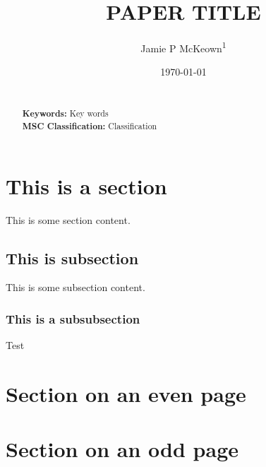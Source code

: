 \documentclass[9pt, reqno]{amsart}
\numberwithin{equation}{section}
\renewcommand{\(}{\left(}
\renewcommand{\)}{\right)}
\theoremstyle{definition}
\theoremstyle{definition}
\theoremstyle{definition}
\newcommand{\draft}[1]{\textcolor{draftcol}{#1}}
\begin{document}
\title{PAPER TITLE}

\author[JP McKeown]{Jamie P McKeown\textsuperscript{1}}




\address[A1]{School of Mathematics, Statistics, and Physics, Newcastle University, Newcastle upon Tyne, UK.}



\date{\today}
\maketitle 





\begin{abstract}
 \centering \bigskip
  \begin{minipage}{\dimexpr\paperwidth-10cm}
 	\draft{\lipsum[1]}  \\
	
 	\bigskip
 	\noindent\textbf{Keywords:} \draft{Key words}\\
	
 	\bigskip
 	\noindent\textbf{MSC Classification:} \draft{Classification} \\	
 \end{minipage} 
 \end{abstract} 




\section{This is a section}
This is some section content.  \\
\subsection{This is subsection}
This is some subsection content.
\subsubsection{This is a subsubsection} Test

\newpage
\section{Section on an even page}
\newpage
\section{Section on an odd page}

\def\bibcommenthead{}%


\end{document}
